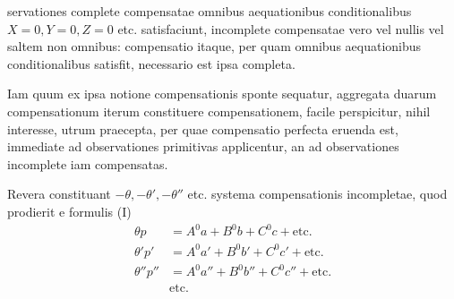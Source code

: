 %
servationes complete compensatae omnibus aequationibus conditionalibus \(X=0,\allowbreak Y=0,\allowbreak Z=0\) etc. satisfaciunt, incomplete compensatae vero vel nullis vel saltem non omnibus: compensatio itaque, per quam omnibus aequationibus conditionalibus satisfit, necessario est ipsa completa.

Iam quum ex ipsa notione compensationis sponte sequatur, aggregata duarum compensationum iterum constituere compensationem, facile perspicitur, nihil interesse, utrum praecepta, per quae compensatio perfecta eruenda est, immediate ad observationes primitivas applicentur, an ad observationes incomplete iam compensatas.

Revera constituant \(-\theta,-\theta',-\theta''\) etc. systema compensationis incompletae, quod prodierit e formulis (I)
\[
\begin{aligned}
\theta p&=A^0a+B^0b+C^0c+\text{etc.}\\
\theta'p'&=A^0a'+B^0b'+C^0c'+\text{etc.}\\
\theta''p''&=A^0a''+B^0b''+C^0c''+\text{etc.}\\
&\text{etc.}
\end{aligned}
\]

